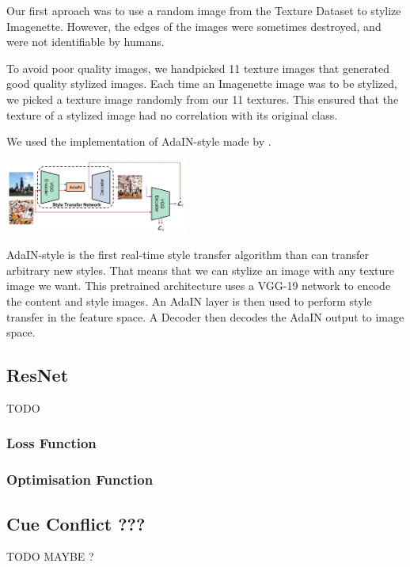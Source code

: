 \documentclass{article}
\begin{document}
\noindent
Our first aproach was to use a random image from the Texture Dataset to stylize Imagenette. However, 
the edges of the images were sometimes destroyed, and were not identifiable by humans. \smallskip

\noindent
To avoid poor quality images, we handpicked 11 texture images that generated good quality stylized images.
Each time an Imagenette image was to be stylized, we picked a texture image randomly from our 11 textures.
This ensured that the texture of a stylized image had no correlation with its original class. \smallskip

\noindent
We used the implementation of AdaIN-style \cite{huang2017arbitrary} made by \cite{stylizeddatasets2019}.

\includegraphics[width=0.45\textwidth]{imgs/adain_architecture}

AdaIN-style is the first real-time style transfer algorithm than can transfer arbitrary new styles.
That means that we can stylize an image with any texture image we want.
This pretrained architecture uses a VGG-19 network to encode the content and style images.
An AdaIN layer is then used to perform style transfer in the feature space.   
A Decoder then decodes the AdaIN output to image space.

\subsection{ResNet}

TODO

\subsubsection{Loss Function}

\subsubsection{Optimisation Function}


\subsection{Cue Conflict ???}

TODO MAYBE ?
\end{document}
